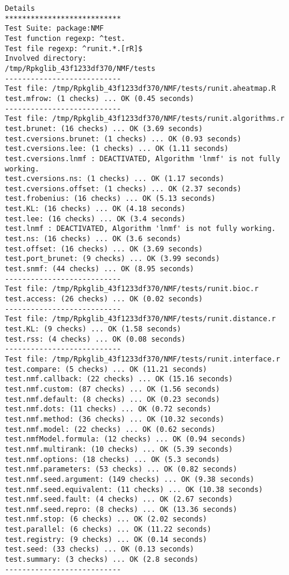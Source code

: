 \documentclass[10pt]{article}\usepackage[]{graphicx}\usepackage[]{color}
\begin{document}
\begin{verbatim}
Details 
*************************** 
Test Suite: package:NMF 
Test function regexp: ^test. 
Test file regexp: ^runit.*.[rR]$ 
Involved directory: 
/tmp/Rpkglib_43f1233df370/NMF/tests 
--------------------------- 
Test file: /tmp/Rpkglib_43f1233df370/NMF/tests/runit.aheatmap.R 
test.mfrow: (1 checks) ... OK (0.45 seconds)
--------------------------- 
Test file: /tmp/Rpkglib_43f1233df370/NMF/tests/runit.algorithms.r 
test.brunet: (16 checks) ... OK (3.69 seconds)
test.cversions.brunet: (1 checks) ... OK (0.93 seconds)
test.cversions.lee: (1 checks) ... OK (1.11 seconds)
test.cversions.lnmf : DEACTIVATED, Algorithm 'lnmf' is not fully working.
test.cversions.ns: (1 checks) ... OK (1.17 seconds)
test.cversions.offset: (1 checks) ... OK (2.37 seconds)
test.frobenius: (16 checks) ... OK (5.13 seconds)
test.KL: (16 checks) ... OK (4.18 seconds)
test.lee: (16 checks) ... OK (3.4 seconds)
test.lnmf : DEACTIVATED, Algorithm 'lnmf' is not fully working.
test.ns: (16 checks) ... OK (3.6 seconds)
test.offset: (16 checks) ... OK (3.69 seconds)
test.port_brunet: (9 checks) ... OK (3.99 seconds)
test.snmf: (44 checks) ... OK (8.95 seconds)
--------------------------- 
Test file: /tmp/Rpkglib_43f1233df370/NMF/tests/runit.bioc.r 
test.access: (26 checks) ... OK (0.02 seconds)
--------------------------- 
Test file: /tmp/Rpkglib_43f1233df370/NMF/tests/runit.distance.r 
test.KL: (9 checks) ... OK (1.58 seconds)
test.rss: (4 checks) ... OK (0.08 seconds)
--------------------------- 
Test file: /tmp/Rpkglib_43f1233df370/NMF/tests/runit.interface.r 
test.compare: (5 checks) ... OK (11.21 seconds)
test.nmf.callback: (22 checks) ... OK (15.16 seconds)
test.nmf.custom: (87 checks) ... OK (1.56 seconds)
test.nmf.default: (8 checks) ... OK (0.23 seconds)
test.nmf.dots: (11 checks) ... OK (0.72 seconds)
test.nmf.method: (36 checks) ... OK (10.32 seconds)
test.nmf.model: (22 checks) ... OK (0.62 seconds)
test.nmfModel.formula: (12 checks) ... OK (0.94 seconds)
test.nmf.multirank: (10 checks) ... OK (5.39 seconds)
test.nmf.options: (18 checks) ... OK (5.3 seconds)
test.nmf.parameters: (53 checks) ... OK (0.82 seconds)
test.nmf.seed.argument: (149 checks) ... OK (9.38 seconds)
test.nmf.seed.equivalent: (11 checks) ... OK (10.38 seconds)
test.nmf.seed.fault: (4 checks) ... OK (2.67 seconds)
test.nmf.seed.repro: (8 checks) ... OK (13.36 seconds)
test.nmf.stop: (6 checks) ... OK (2.02 seconds)
test.parallel: (6 checks) ... OK (11.22 seconds)
test.registry: (9 checks) ... OK (0.14 seconds)
test.seed: (33 checks) ... OK (0.13 seconds)
test.summary: (3 checks) ... OK (2.8 seconds)
--------------------------- 

\end{verbatim}
\end{document}
